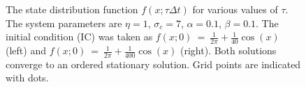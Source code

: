 \begin{figure}[tbp]
	\centering
	\caption{The state distribution function $f(x;\tau \Delta t)$ for various values of $\tau$. The system parameters are $\eta=1$, $\sigma_c =7$, $\alpha=0.1$, $\beta=0.1$. The initial condition (IC) was taken as $f(x;0)~=~\frac{1}{2\pi}+\frac{1}{40} \cos(x)$ (left) and $f(x;0)~=~\frac{1}{2\pi}+\frac{1}{400} \cos(x)$ (right). Both solutions converge to an ordered stationary solution. Grid points are indicated with dots.}
	\label{fig:cont_closure_invertingbehaviour_IC2_IC3_s7}
\end{figure}

